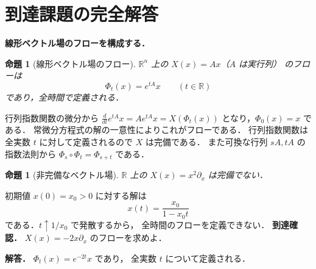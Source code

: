 \documentclass[a5paper,10pt,onecolumn]{jsarticle}
\makeatletter
\theoremstyle{mathnotetheorem}
\newtheorem{proposition}[theorem]{命題}
\renewcommand{\proofname}{証明}
\renewenvironment{proof}[1][\proofname]{%
  \par\pushQED{\qed}\normalfont\topsep4\p@\@plus2\p@\relax
  \trivlist\item[\hskip\labelsep\bfseries #1]\ignorespaces
}{\popQED\endtrivlist\@endpefalse}
\makeatother
\begin{document}
\section{到達課題の完全解答}
\noindent\textbf{線形ベクトル場のフローを構成する．}
\begin{proposition}[線形ベクトル場のフロー]
$\mathbb R^n$ 上の $X(x)=Ax$（$A$ は実行列）
のフローは
\[
\Phi_t(x)=e^{tA}x\qquad(t\in\mathbb R)
\]
であり，全時間で定義される．
\end{proposition}
\begin{proof}
行列指数関数の微分から
$\frac d{dt}e^{tA}x=Ae^{tA}x=X(\Phi_t(x))$
となり，$\Phi_0(x)=x$ である．
常微分方程式の解の一意性によりこれがフローである．
行列指数関数は全実数 $t$ に対して定義されるので
$X$ は完備である．
また可換な行列 $sA,tA$ の指数法則から
$\Phi_s\circ\Phi_t=\Phi_{s+t}$ である．
\end{proof}
\begin{proposition}[非完備なベクトル場]
$\mathbb R$ 上の $X(x)=x^2\partial_x$ は完備でない．
\end{proposition}
\begin{proof}
初期値 $x(0)=x_0>0$ に対する解は
\[
x(t)=\frac{x_0}{1-x_0t}
\]
である．$t\uparrow1/x_0$ で発散するから，
全時間のフローを定義できない．
\end{proof}
\noindent\textbf{到達確認．}
$X(x)=-2x\partial_x$ のフローを求めよ．
\par\noindent\textbf{解答．}
$\Phi_t(x)=e^{-2t}x$ であり，
全実数 $t$ について定義される．
\end{document}
